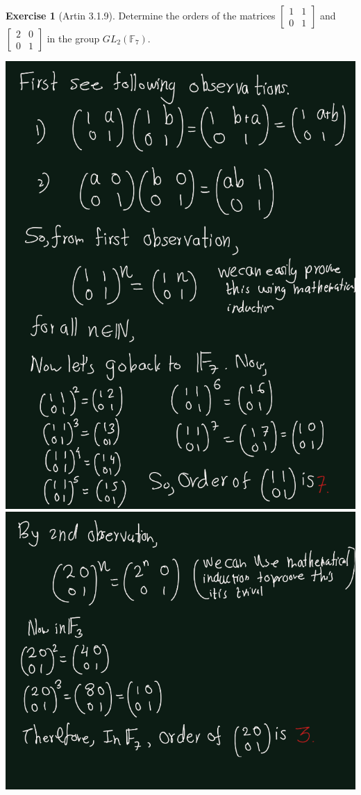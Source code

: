 \documentclass[
]{book}
\theoremstyle{definition}
\theoremstyle{definition}
\theoremstyle{definition}
\newtheorem{exercise}{Exercise}[chapter]
\theoremstyle{definition}
\theoremstyle{remark}
\begin{document}
\begin{exercise}[Artin 3.1.9]
\protect\hypertarget{exr:unnamed-chunk-274}{}\label{exr:unnamed-chunk-274}Determine the orders of the matrices
\(\begin{bmatrix} 1 & 1 \\ 0 & 1 \end{bmatrix}\)
and
\(\begin{bmatrix} 2 & 0 \\ 0 & 1 \end{bmatrix}\)
in the group \(GL_2(\mathbb{F}_7)\).
\end{exercise}

\includegraphics{figures/ch_3/ex-1.9-1.png}
\includegraphics{figures/ch_3/ex-1.9-2.png}
\end{document}
